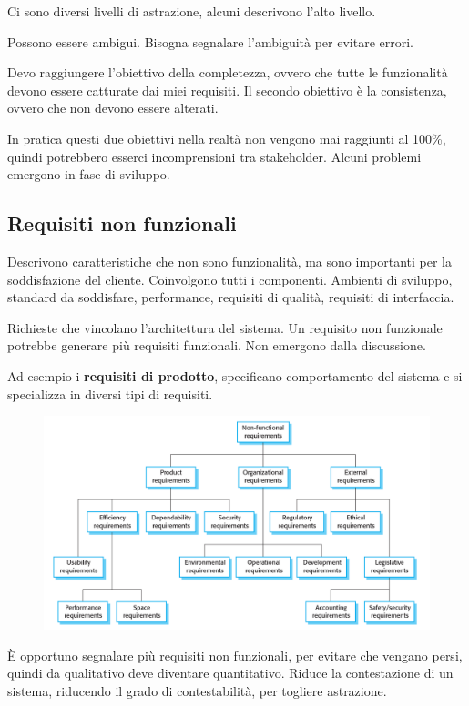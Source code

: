 Ci sono diversi livelli di astrazione, alcuni descrivono l'alto livello.

Possono essere ambigui. Bisogna segnalare l'ambiguità per evitare errori.

Devo raggiungere l'obiettivo della completezza, ovvero che tutte le funzionalità devono essere 
catturate dai miei requisiti. Il secondo obiettivo è la consistenza, ovvero che non 
devono essere alterati.

In pratica questi due obiettivi nella realtà non vengono mai raggiunti al 100\%, quindi 
potrebbero esserci incomprensioni tra stakeholder.
Alcuni problemi emergono in fase di sviluppo.
\subsection{Requisiti non funzionali}
Descrivono caratteristiche che non sono funzionalità, ma sono importanti per 
la soddisfazione del cliente. 
Coinvolgono tutti i componenti. Ambienti di sviluppo, standard da soddisfare, performance, 
requisiti di qualità, requisiti di interfaccia.

Richieste che vincolano l'architettura del sistema.
Un requisito non funzionale potrebbe generare più requisiti funzionali.
Non emergono dalla discussione.

Ad esempio i \textbf{requisiti di prodotto}, specificano comportamento
del sistema e si specializza in diversi tipi di requisiti.
\begin{figure}[H]
    \centering
    \includegraphics[scale=0.4]{img/nonfunctional.png}
\end{figure}
È opportuno segnalare più requisiti non funzionali, per evitare che vengano 
persi, quindi da qualitativo deve diventare quantitativo.
Riduce la contestazione di un sistema, riducendo il grado di contestabilità, per 
togliere astrazione.

